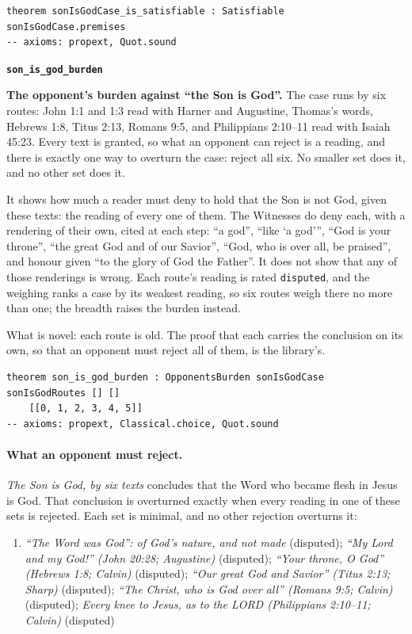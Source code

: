 \documentclass[11pt,paper=\testimonypaper,DIV=13,parskip=false]{scrartcl}
\begin{document}
{\small\begin{verbatim}
theorem sonIsGodCase_is_satisfiable : Satisfiable sonIsGodCase.premises
-- axioms: propext, Quot.sound
\end{verbatim}}
\par\medskip\noindent\textbf{\texttt{son\_\allowbreak{}is\_\allowbreak{}god\_\allowbreak{}burden}}\par\nobreak\noindent
\textbf{The opponent’s burden against “the Son is God”.} The case runs by six routes: John 1:1 and 1:3 read with Harner and Augustine, Thomas’s words, Hebrews 1:8, Titus 2:13, Romans 9:5, and Philippians 2:10–11 read with Isaiah 45:23. Every text is granted, so what an opponent can reject is a reading, and there is exactly one way to overturn the case: reject all six. No smaller set does it, and no other set does it.

It shows how much a reader must deny to hold that the Son is not God, given these texts: the reading of every one of them. The Witnesses do deny each, with a rendering of their own, cited at each step: “a god”, “like ‘a god’”, “God is your throne”, “the great God and of our Savior”, “God, who is over all, be praised”, and honour given “to the glory of God the Father”. It does not show that any of those renderings is wrong. Each route’s reading is rated \texttt{disputed}, and the weighing ranks a case by its weakest reading, so six routes weigh there no more than one; the breadth raises the burden instead.

What is novel: each route is old. The proof that each carries the conclusion on its own, so that an opponent must reject all of them, is the library’s.

{\small\begin{verbatim}
theorem son_is_god_burden : OpponentsBurden sonIsGodCase sonIsGodRoutes [] []
    [[0, 1, 2, 3, 4, 5]]
-- axioms: propext, Classical.choice, Quot.sound
\end{verbatim}}
\paragraph{What an opponent must reject.} \emph{The Son is God, by six texts} concludes that the Word who became flesh in Jesus is God. That conclusion is overturned exactly when every reading in one of these sets is rejected. Each set is minimal, and no other rejection overturns it:
\begin{enumerate}
\item \emph{“The Word was God”: of God’s nature, and not made} (disputed); \emph{“My Lord and my God!” (John 20:28; Augustine)} (disputed); \emph{“Your throne, O God” (Hebrews 1:8; Calvin)} (disputed); \emph{“Our great God and Savior” (Titus 2:13; Sharp)} (disputed); \emph{“The Christ, who is God over all” (Romans 9:5; Calvin)} (disputed); \emph{Every knee to Jesus, as to the LORD (Philippians 2:10–11; Calvin)} (disputed)
\end{enumerate}
\end{document}
